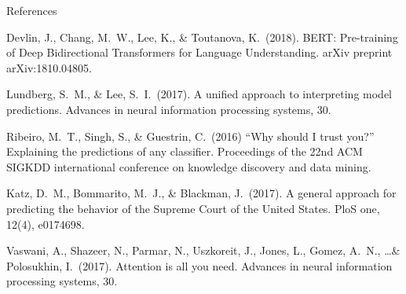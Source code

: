 \begin{frame}{References}
\footnotesize
\begin{thebibliography}{99}
 Devlin, J\@., Chang, M\@.\ W\@., Lee, K\@., \& Toutanova, K\@.\ (2018). BERT: Pre-training of Deep Bidirectional Transformers for Language Understanding. arXiv preprint arXiv:1810.04805\@.

 Lundberg, S\@.\ M\@., \& Lee, S\@.\ I\@.\ (2017). A unified approach to interpreting model predictions. Advances in neural information processing systems, 30\@.

 Ribeiro, M\@.\ T\@., Singh, S\@., \& Guestrin, C\@.\ (2016) ``Why should I trust you?'' Explaining the predictions of any classifier. Proceedings of the 22nd ACM SIGKDD international conference on knowledge discovery and data mining\@.

 Katz, D\@.\ M\@., Bommarito, M\@.\ J\@., \& Blackman, J\@.\ (2017). A general approach for predicting the behavior of the Supreme Court of the United States. PloS one, 12(4), e0174698\@.

 Vaswani, A\@., Shazeer, N\@., Parmar, N\@., Uszkoreit, J\@., Jones, L\@., Gomez, A\@.\ N\@., \ldots \& Polosukhin, I\@.\ (2017). Attention is all you need. Advances in neural information processing systems, 30\@.
\end{thebibliography}
\end{frame}

